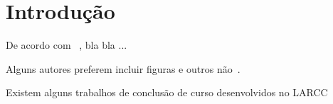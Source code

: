 \chapter*{Introdução} \label{chap:intro}




\lipsum[2-4]

\cite{larcc}


De acordo com ~\cite{larcc:intra-cloud_networking_cloudstack:PDP:17}, bla bla ...


Alguns autores preferem incluir figuras e outros não~\citep{larcc:parsec_cloudstack_lxc_kvm:ISCC:2018}.


Existem alguns trabalhos de conclusão de curso desenvolvidos no LARCC~\citep{larcc:dinei_nadine:TCC:17,larcc:anderson_willian:TCC:17,larcc:bruna_eduardo:TCC:13,larcc:charles_stein:TCC:18}